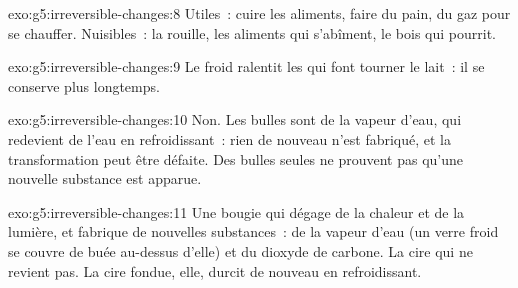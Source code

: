 \begin{solution}{exo:g5:irreversible-changes:8}
Utiles~: cuire les aliments, faire du pain,  du gaz pour se
chauffer. Nuisibles~: la rouille, les aliments qui s'abîment, le bois
qui pourrit.
\end{solution}

\begin{solution}{exo:g5:irreversible-changes:9}
Le froid ralentit les  qui font tourner le
lait~: il se conserve plus longtemps.
\end{solution}

\begin{solution}{exo:g5:irreversible-changes:10}
Non. Les bulles sont de la vapeur d'eau, qui redevient de l'eau en
refroidissant~: rien de nouveau n'est fabriqué, et la transformation
peut être défaite. Des bulles seules ne prouvent pas qu'une nouvelle
substance est apparue.
\end{solution}

\begin{solution}{exo:g5:irreversible-changes:11}
Une bougie qui  dégage de la chaleur et de la lumière, et fabrique
de nouvelles substances~: de la vapeur d'eau (un verre froid se couvre
de buée au-dessus d'elle) et du dioxyde de carbone. La cire qui  ne
revient pas. La cire fondue, elle, durcit de nouveau en refroidissant.
\end{solution}
